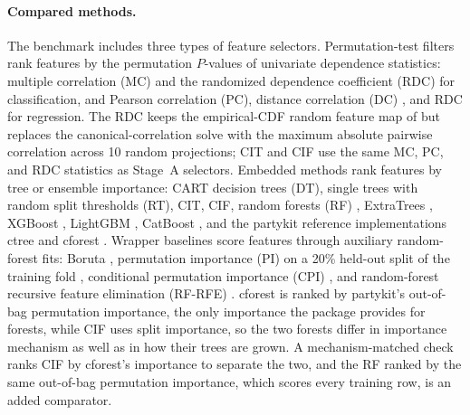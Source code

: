 \paragraph{Compared methods.}
\label{sec:experiments-methods}%
The benchmark includes three types of feature selectors. Permutation-test
filters rank features by the permutation $P$-values of univariate dependence
statistics: multiple correlation (MC) and the randomized dependence coefficient
(RDC) for classification, and Pearson correlation (PC), distance correlation
(DC) \citep{Szekely2007DistanceCorrelation}, and RDC for regression. The RDC
keeps the empirical-CDF random feature map of \citet{LopezPaz2013RDC} but
replaces the canonical-correlation solve with the maximum absolute pairwise
correlation across 10 random projections; CIT and CIF use the same MC, PC, and
RDC statistics as Stage~A selectors. Embedded methods rank features by tree or
ensemble importance: CART decision trees (DT), single trees with random split
thresholds (RT), CIT, CIF, random forests (RF) \citep{Breiman2001RandomForests},
ExtraTrees \citep{Geurts2006ExtraTrees}, XGBoost \citep{ChenGuestrin2016XGBoost},
LightGBM \citep{Ke2017LightGBM}, CatBoost \citep{Prokhorenkova2018CatBoost},
and the partykit reference implementations ctree and cforest
\citep{RPartykitPackage,Hothorn2006UnbiasedRecursivePartitioning,HothornZeileis2015Partykit}.
Wrapper baselines score features through auxiliary random-forest fits: Boruta
\citep{Kursa2010Boruta}, permutation importance (PI) on a 20\% held-out split of
the training fold \citep{Breiman2001RandomForests,Strobl2007BiasRFVariableImportance},
conditional permutation importance (CPI)
\citep{DebeerStrobl2020ConditionalPermutationImportanceRevisited}, and
random-forest recursive feature elimination (RF-RFE)
\citep{Guyon2002RFE,Pedregosa2011ScikitLearn}. cforest is ranked by partykit's
out-of-bag permutation importance, the only importance the package provides for
forests, while CIF uses split importance, so the two forests differ in
importance mechanism as well as in how their trees are grown. A
mechanism-matched check ranks CIF by cforest's importance to separate the two,
and the RF ranked by the same out-of-bag permutation importance, which scores
every training row, is an added comparator.

